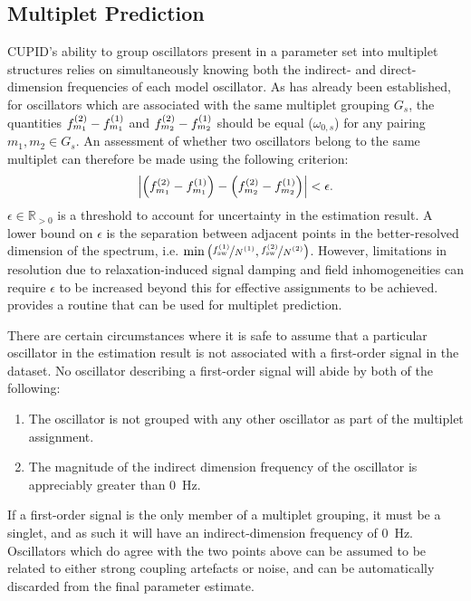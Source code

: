 \subsection{Multiplet Prediction}
\label{subsec:mp-selection}
\ac{CUPID}'s ability to group oscillators present in a parameter set into
multiplet structures relies on simultaneously knowing both the indirect- and
direct-dimension frequencies of each model oscillator. As has already been
established, for oscillators which are associated with the same multiplet
grouping $G_s$, the quantities $f^{(2)}_{m_1} - f^{(1)}_{m_1}$ and $f^{(2)}_{m_2} -
f^{(1)}_{m_2}$ should be equal ($\omega_{0,s}$) for any pairing  $m_1, m_2 \in
G_s$. An assessment of whether two oscillators belong to the same multiplet can
therefore be made using the following criterion:
\begin{equation}
    \left \lvert
        \left( f^{(2)}_{m_1} - f^{(1)}_{m_1} \right) -
        \left( f^{(2)}_{m_2} - f^{(1)}_{m_2} \right)
    \right \rvert < \epsilon.
\end{equation}
$\epsilon \in \mathbb{R}_{>0}$ is a threshold to account for uncertainty in
the estimation result. A lower bound on $\epsilon$ is the separation between
adjacent points in the better-resolved dimension of the spectrum, i.e.
$\min\left(\nicefrac{\fswone}{\None},
\nicefrac{\fswtwo}{\Ntwo}\right)$.  However, limitations in resolution due to
relaxation-induced signal damping and field inhomogeneities can require
$\epsilon$ to be increased beyond this for effective assignments
to be achieved.  provides a \Python routine that
can be used for multiplet prediction.

There are certain circumstances where it is safe to assume that a
particular oscillator in the estimation result is not associated with a
first-order signal in the dataset.
No oscillator describing a first-order signal will abide by both of the
following:
\begin{enumerate}
    \item The oscillator is not grouped with any other oscillator as part of
        the multiplet assignment.
    \item The magnitude of the indirect dimension frequency of the oscillator
        is appreciably greater than \qty{0}{\hertz}.
\end{enumerate}
If a first-order signal is the only
member of a multiplet grouping, it must be a singlet, and as such it will have
an indirect-dimension frequency of \qty{0}{\hertz}. Oscillators which do agree
with the two points above can be assumed to be related to either strong
coupling artefacts or noise, and can be automatically discarded from the final
parameter estimate.
